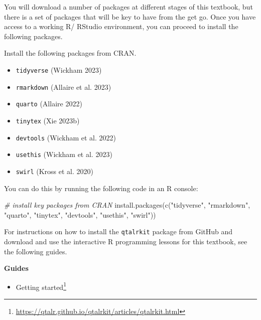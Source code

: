 \documentclass[
  letterpaper,
]{latex/krantz}
\newenvironment{Shaded}{\begin{snugshade}}{\end{snugshade}}
\newcommand{\CommentTok}[1]{\textcolor[rgb]{0.00,0.00,0.00}{\textit{#1}}}
\newcommand{\FunctionTok}[1]{\textcolor[rgb]{0.00,0.00,0.00}{#1}}
\newcommand{\NormalTok}[1]{\textcolor[rgb]{0.00,0.00,0.00}{#1}}
\newcommand{\StringTok}[1]{\textcolor[rgb]{0.00,0.00,0.00}{#1}}
\providecommand{\tightlist}{%
  \setlength{\itemsep}{0pt}\setlength{\parskip}{0pt}}\usepackage{longtable,booktabs,array}
\DeclareRobustCommand{\href}[2]{#2\footnote{\url{#1}}}
\begin{document}
You will download a number of packages at different stages of this
textbook, but there is a set of packages that will be key to have from
the get go. Once you have access to a working R/ RStudio environment,
you can proceed to install the following packages.

Install the following packages from CRAN.

\begin{itemize}
\tightlist
\item
  \texttt{tidyverse} (Wickham 2023)
\item
  \texttt{rmarkdown} (Allaire et al. 2023)
\item
  \texttt{quarto} (Allaire 2022)
\item
  \texttt{tinytex} (Xie 2023b)
\item
  \texttt{devtools} (Wickham et al. 2022)
\item
  \texttt{usethis} (Wickham et al. 2023)
\item
  \texttt{swirl} (Kross et al. 2020)
\end{itemize}

You can do this by running the following code in an R console:

\begin{Shaded}
\begin{Highlighting}[]
 \CommentTok{\# install key packages from CRAN}
\FunctionTok{install.packages}\NormalTok{(}\FunctionTok{c}\NormalTok{(}\StringTok{"tidyverse"}\NormalTok{, }\StringTok{"rmarkdown"}\NormalTok{, }\StringTok{"quarto"}\NormalTok{, }\StringTok{"tinytex"}\NormalTok{, }\StringTok{"devtools"}\NormalTok{, }\StringTok{"usethis"}\NormalTok{, }\StringTok{"swirl"}\NormalTok{))}
\end{Highlighting}
\end{Shaded}

For instructions on how to install the \texttt{qtalrkit} package from
GitHub and download and use the interactive R programming lessons for
this textbook, see the following guides.

\begin{tcolorbox}[enhanced jigsaw, arc=.35mm, leftrule=.75mm, rightrule=.15mm, opacityback=0, colback=white, breakable, bottomrule=.15mm, left=2mm, toprule=.15mm]

\textbf{ Guides}

\begin{itemize}
\tightlist
\item
  \href{https://qtalr.github.io/qtalrkit/articles/qtalrkit.html}{Getting
  started}
\end{itemize}

\end{tcolorbox}
\end{document}
